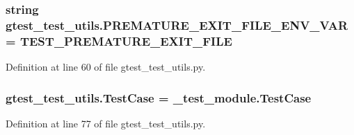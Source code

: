 \subsubsection[{\texorpdfstring{P\+R\+E\+M\+A\+T\+U\+R\+E\+\_\+\+E\+X\+I\+T\+\_\+\+F\+I\+L\+E\+\_\+\+E\+N\+V\+\_\+\+V\+AR}{PREMATURE_EXIT_FILE_ENV_VAR}}]{\setlength{\rightskip}{0pt plus 5cm}string gtest\+\_\+test\+\_\+utils.\+P\+R\+E\+M\+A\+T\+U\+R\+E\+\_\+\+E\+X\+I\+T\+\_\+\+F\+I\+L\+E\+\_\+\+E\+N\+V\+\_\+\+V\+AR = \textquotesingle{}T\+E\+S\+T\+\_\+\+P\+R\+E\+M\+A\+T\+U\+R\+E\+\_\+\+E\+X\+I\+T\+\_\+\+F\+I\+LE\textquotesingle{}}\hypertarget{namespacegtest__test__utils_aa961c38a16224b2e7fd8c93fc1d2a90f}{}\label{namespacegtest__test__utils_aa961c38a16224b2e7fd8c93fc1d2a90f}


Definition at line 60 of file gtest\+\_\+test\+\_\+utils.\+py.

\subsubsection[{\texorpdfstring{Test\+Case}{TestCase}}]{\setlength{\rightskip}{0pt plus 5cm}gtest\+\_\+test\+\_\+utils.\+Test\+Case = \+\_\+test\+\_\+module.\+Test\+Case}\hypertarget{namespacegtest__test__utils_acb97a85206c09d233db6c7f2362e5428}{}\label{namespacegtest__test__utils_acb97a85206c09d233db6c7f2362e5428}


Definition at line 77 of file gtest\+\_\+test\+\_\+utils.\+py.


